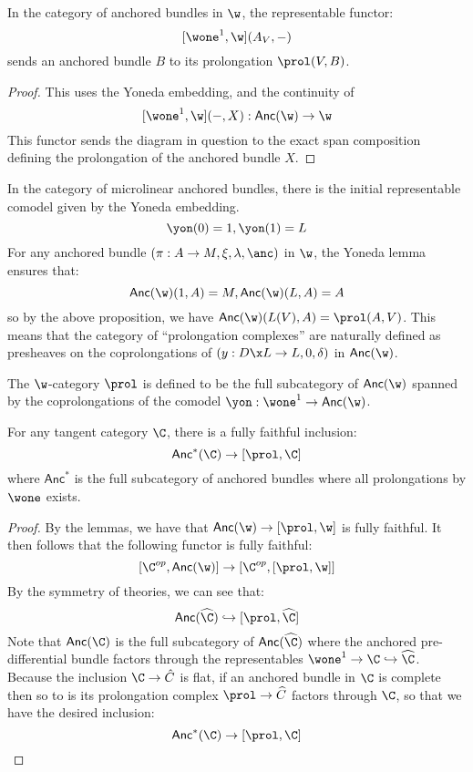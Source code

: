 \begin{proposition}
    In the category of anchored bundles in $\w$, the representable functor:
    \[
        [\wone^1, \w](A_V, -)        
    \]
    sends an anchored bundle $B$ to its prolongation $\prol(V, B)$.
\end{proposition}
\begin{proof}
    This uses the Yoneda embedding, and the continuity of \[[\wone^1, \w](-, X): \mathsf{Anc}(\w) \to \w \] 
    This functor sends the diagram in question to the exact span composition defining the prolongation of the anchored bundle $X$.
\end{proof}

In the category of microlinear anchored bundles, there is the initial representable comodel given by the Yoneda embedding.
\[
	\yon(0) = 1, \yon(1) = L
\] 
For any anchored bundle $(\pi:A \to M, \xi, \lambda, \anc)$ in $\w$, the Yoneda lemma ensures that:
\[
	\mathsf{Anc}(\w)(1, A) = M, \mathsf{Anc}(\w)(L, A) = A
\]
so by the above proposition, we have $\mathsf{Anc}(\w)(L(V), A) = \prol(A, V)$.
This means that the category of ``prolongation complexes'' are naturally defined as presheaves on the coprolongations of $(y:D \x L \to L, 0, \delta)$ in $\mathsf{Anc}(\w)$.

\begin{definition}
	The $\w$-category ${\prol}$ is defined to be the full subcategory of $\mathsf{Anc}(\w)$ spanned by the coprolongations of the comodel $\yon:\wone^1 \to \mathsf{Anc}(\w)$.
\end{definition}


\begin{proposition}
	For any tangent category $\C$, there is a fully faithful inclusion:
	\[
		\mathsf{Anc}^*(\C) \to [{\prol}, \C]
	\]
	where $\mathsf{Anc}^*$ is the full subcategory of anchored bundles where all prolongations by $\wone$ exists.
\end{proposition}
\begin{proof}
	By the lemmas, we have that $\mathsf{Anc}(\w) \to [{\prol}, \w]$ is fully faithful.
	It then follows that the following functor is fully faithful:
	\[
		[\C^{op}, \mathsf{Anc}(\w)] \to [\C^{op}, [{\prol}, \w]]
	\]
	By the symmetry of theories, we can see that:
	\[
		\mathsf{Anc}(\widehat{\C}) \hookrightarrow [{\prol}, \widehat{\C}]
	\]
	Note that $\mathsf{Anc}(\C)$ is the full subcategory of $\mathsf{Anc}(\widehat{\C})$ where the anchored pre-differential bundle factors through the representables $\wone^1 \to \C \hookrightarrow \widehat{\C}$. 
	Because the inclusion $\C \to \hat{C}$ is flat, if an anchored bundle in $\C$ is complete then so to is its prolongation complex ${\prol} \to \widehat{C}$ factors through $\C$, so that we have the desired inclusion: 
	\[
		\mathsf{Anc}^*(\C) \to [{\prol}, \C]
	\]
\end{proof}

